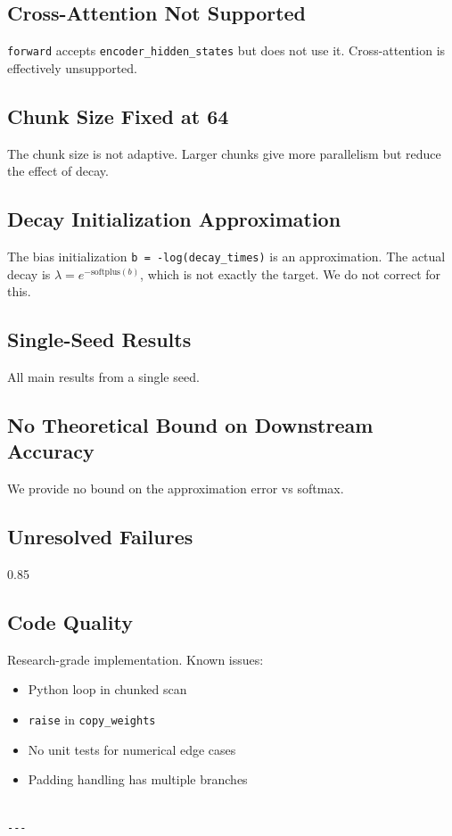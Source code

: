\subsection{Cross-Attention Not Supported}

\texttt{forward} accepts \texttt{encoder\_hidden\_states} but does not use it. Cross-attention 
is effectively unsupported.

\subsection{Chunk Size Fixed at 64}

The chunk size is not adaptive. Larger chunks give more parallelism but 
reduce the effect of decay.

\subsection{Decay Initialization Approximation}

The bias initialization \texttt{b = -log(decay\_times)} is an approximation. The 
actual decay is $\lambda = e^{-\text{softplus}(b)}$, which is not exactly 
the target. We do not correct for this.

\subsection{Single-Seed Results}

All main results from a single seed.

\subsection{No Theoretical Bound on Downstream Accuracy}

We provide no bound on the approximation error vs softmax.

\subsection{Unresolved Failures}

0.85

\subsection{Code Quality}

Research-grade implementation. Known issues:
\begin{itemize}
\item Python loop in chunked scan
\item \texttt{raise} in \texttt{copy\_weights}
\item No unit tests for numerical edge cases
\item Padding handling has multiple branches
\end{itemize}
\begin{lstlisting}

---
\end{lstlisting}